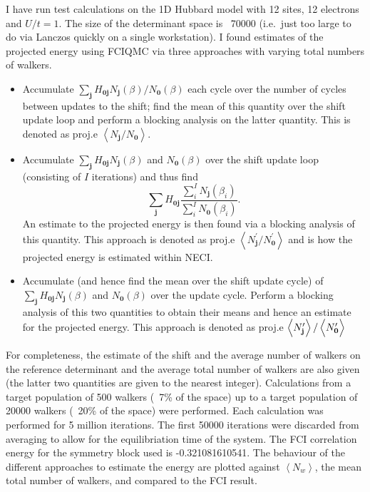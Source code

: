 \documentclass[a4paper, 12pt]{revtex4}
\newcommand{\bj}{\mathbf{j}}
\newcommand{\bz}{\mathbf{0}}
\newcommand{\av}[1]{\left\langle#1\right\rangle}
\begin{document}
I have run test calculations on the 1D Hubbard model with 12 sites, 12 electrons and $U/t=1$.  The size of the determinant space is ~70000 (i.e.\ just too large to do via Lanczos quickly on a single workstation).  I found estimates of the projected energy using FCIQMC via three approaches with varying total numbers of walkers.
\begin{itemize}
\item Accumulate $\sum_\bj H_{\bz\bj} N_\bj(\beta)/N_\bz(\beta)$ each cycle over the number of cycles between updates to the shift; find the mean of this quantity over the shift update loop and perform a blocking analysis on the latter quantity.  This is denoted as proj.e $\av{N_\bj/N_\bz}$.
\item Accumulate $\sum_\bj H_{\bz\bj} N_\bj(\beta)$ and $N_\bz(\beta)$ over the shift update loop (consisting of $I$ iterations) and thus find
    \begin{equation}
    \sum_\bj H_{\bz\bj} \frac{\sum_i^I N_\bj(\beta_i)}{\sum_i^I N_\bz(\beta_i)}.
    \end{equation}
An estimate to the projected energy is then found via a blocking analysis of this quantity.  This approach is denoted as proj.e $\av{N_\bj^\prime/N_\bz^\prime}$ and is how the projected energy is estimated within NECI.
\item Accumulate (and hence find the mean over the shift update cycle) of  $\sum_\bj H_{\bz\bj} N_\bj(\beta)$ and $N_\bz(\beta)$ over the update cycle.  Perform a blocking analysis of this two quantities to obtain their means and hence an estimate for the projected energy.  This approach is denoted as proj.e $\av{N_\bj^\prime}/\av{N_\bz^\prime\vphantom{N_\bj^\prime}}$
\end{itemize}
For completeness, the estimate of the shift and the average number of walkers on the reference determinant and the average total number of walkers are also given (the latter two quantities are given to the nearest integer).  Calculations from a target population of 500 walkers (~7\% of the space) up to a target population of 20000 walkers (~20\% of the space) were performed.  Each calculation was performed for 5 million iterations.  The first 50000 iterations were discarded from averaging to allow for the equilibriation time of the system.  The FCI correlation energy for the symmetry block used is -0.321081610541.  The behaviour of the different approaches to estimate the energy are plotted against $\av{N_w}$, the mean total number of walkers, and compared to the FCI result.
\end{document}
